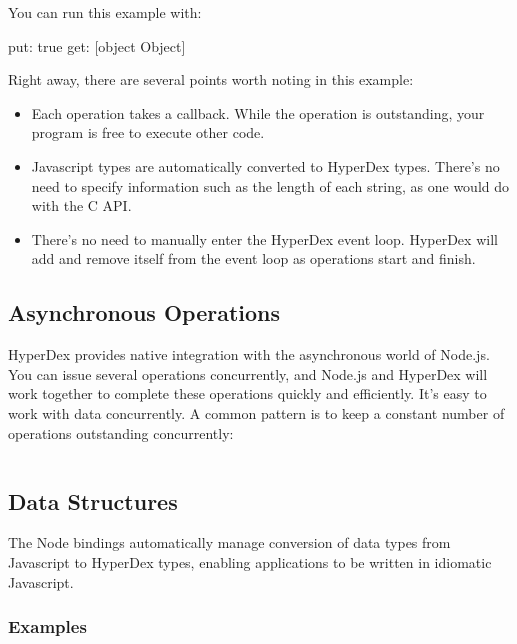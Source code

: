 You can run this example with:

\begin{consolecode}
put: true
get: [object Object]
\end{consolecode}

Right away, there are several points worth noting in this example:

\begin{itemize}
\item Each operation takes a callback.  While the operation is outstanding, your
program is free to execute other code.

\item Javascript types are automatically converted to HyperDex types.  There's
no need to specify information such as the length of each string, as one would
do with the C API.

\item There's no need to manually enter the HyperDex event loop.  HyperDex will
add and remove itself from the event loop as operations start and finish.
\end{itemize}

\subsection{Asynchronous Operations}
\label{sec:api:node:async-ops}

HyperDex provides native integration with the asynchronous world of Node.js.
You can issue several operations concurrently, and Node.js and HyperDex will
work together to complete these operations quickly and efficiently.  It's easy
to work with data concurrently.  A common pattern is to keep a constant number
of operations outstanding concurrently:

\inputminted{javascript}{\topdir/api/node.js/window-pattern.js}

\subsection{Data Structures}
\label{sec:api:node:data-structures}

The Node bindings automatically manage conversion of data types from Javascript
to HyperDex types, enabling applications to be written in idiomatic Javascript.

\subsubsection{Examples}
\label{sec:api:node:examples}

